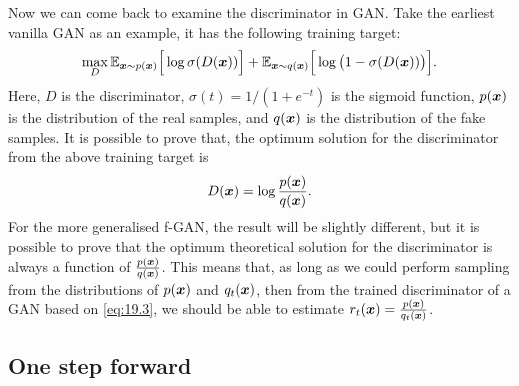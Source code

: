 Now we can come back to examine the discriminator in GAN. Take the earliest vanilla GAN as an example, it has the following training target:
\begin{equation}
    \label{eq:19.3}
    \max_{D}\mathbb{E}_{\bm{x}\sim p(\bm{x})}\Big[\log \sigma(D(\bm{x}))\Big]+\mathbb{E}_{\bm{x}\sim q(\bm{x})}\Big[\log \big(1-\sigma(D(\bm{x}))\big)\Big].
\end{equation}
Here, $D$ is the discriminator, $\sigma(t)=1/(1+e^{-t})$ is the sigmoid function, $p(\bm{x})$ is the distribution of the real samples, and $q(\bm{x})$ is the distribution of the fake samples. It is possible to prove that, the optimum solution for the discriminator from the above training target is 
\begin{equation}
    \label{eq:19.4}
    D(\bm{x})=\log\frac{p(\bm{x})}{q(\bm{x})}.
\end{equation}
For the more generalised f-GAN, the result will be slightly different, but it is possible to prove that the optimum theoretical solution for the discriminator is always a function of $\frac{p(\bm{x})}{q(\bm{x})}$. This means that, as long as we could perform sampling from the distributions of $p(\bm{x})$ and $q_t(\bm{x})$, then from the trained discriminator of a GAN based on \cref{eq:19.3}, we should be able to estimate $r_t(\bm{x})=\frac{p(\bm{x})}{q_t(\bm{x})}$.

\subsection{One step forward}

